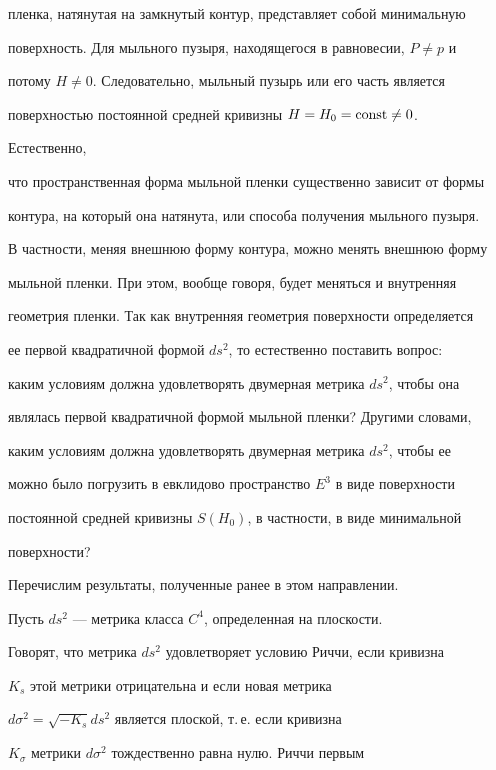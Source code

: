 пленка, натянутая на замкнутый контур, представляет собой минимальную 


поверхность. Для мыльного пузыря, находящегося в равновесии, $P\ne p$ и 


потому $H\ne0$. Следовательно, мыльный пузырь или его часть является 


поверхностью постоянной средней кривизны $H=H_0=\operatorname{const}\ne0$.





Естественно, 


что пространственная форма мыльной пленки существенно зависит от формы 


контура, на который она натянута, или способа получения мыльного пузыря. 


В частности, меняя внешнюю форму контура, можно менять внешнюю форму 


мыльной пленки. При этом, вообще говоря, будет меняться и внутренняя 


геометрия пленки. Так как внутренняя геометрия поверхности определяется 


ее первой квадратичной формой $ds^2$, то естественно поставить вопрос: 


каким условиям должна удовлетворять двумерная метрика $ds^2$, чтобы она 


являлась первой квадратичной формой мыльной пленки? Другими словами, 


каким условиям должна удовлетворять двумерная метрика $ds^2$, чтобы ее 


можно было погрузить в евклидово пространство $E^3$ в виде поверхности 


постоянной средней кривизны $S(H_0)$, в частности, в виде минимальной 


поверхности? 


 


Перечислим результаты, полученные ранее в этом направлении. 


 


Пусть $ds^2$ --- метрика класса $C^4$, определенная на плоскости. 


Говорят, что метрика $ds^2$ удовлетворяет условию Риччи, если кривизна 


$K_s$ этой метрики отрицательна и если новая метрика 


$d\sigma^2=\sqrt{-K_s}ds^2$ является плоской, т.\,е. если кривизна 


$K_\sigma$ метрики $d\sigma^2$ тождественно равна нулю. Риччи первым 


